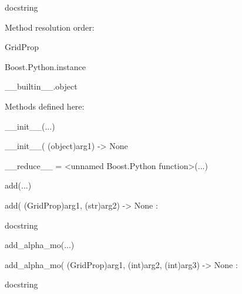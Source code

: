 \documentclass[letterpaper,10pt,english]{sphinxmanual}
\begin{document}
\begin{description}
\begin{description}
\item[{class GridProp(Boost.Python.instance)}] \leavevmode
\begin{DUlineblock}{0em}
\item[] docstring
\item[] 
\item[] Method resolution order:
\item[]
\begin{DUlineblock}{\DUlineblockindent}
\item[] GridProp
\item[] Boost.Python.instance
\item[] \_\_builtin\_\_.object
\item[] 
\end{DUlineblock}
\item[] Methods defined here:
\item[] 
\item[] \_\_init\_\_(...)
\item[]
\begin{DUlineblock}{\DUlineblockindent}
\item[] \_\_init\_\_( (object)arg1) -\textgreater{} None
\item[] 
\end{DUlineblock}
\item[] \_\_reduce\_\_ = \textless{}unnamed Boost.Python function\textgreater{}(...)
\item[] 
\item[] add(...)
\item[]
\begin{DUlineblock}{\DUlineblockindent}
\item[] add( (GridProp)arg1, (str)arg2) -\textgreater{} None :
\item[]
\begin{DUlineblock}{\DUlineblockindent}
\item[] docstring
\item[] 
\end{DUlineblock}
\end{DUlineblock}
\item[] add\_alpha\_mo(...)
\item[]
\begin{DUlineblock}{\DUlineblockindent}
\item[] add\_alpha\_mo( (GridProp)arg1, (int)arg2, (int)arg3) -\textgreater{} None :
\item[]
\begin{DUlineblock}{\DUlineblockindent}
\item[] docstring

\end{DUlineblock}
\end{DUlineblock}
\end{DUlineblock}
\end{description}
\end{description}
\end{document}
